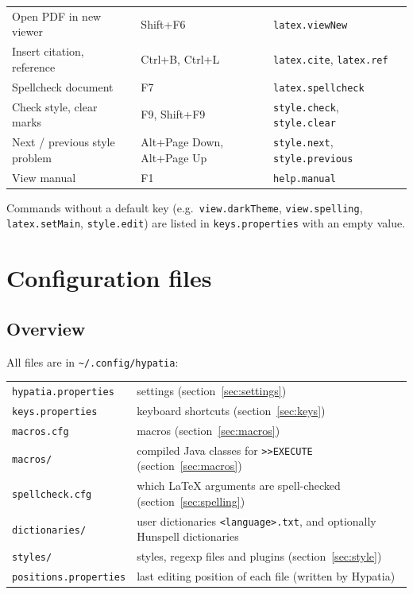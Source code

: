 \documentclass[11pt]{article}
\newcommand{\key}[1]{\textsf{#1}}
\newcommand{\file}[1]{\texttt{#1}}
\newcommand{\cfgdir}{\texttt{\textasciitilde/.config/hypatia}}
\begin{document}
\begin{center}
\begin{tabular}{lll}
        Open PDF in new viewer & \key{Shift+F6} & \verb+latex.viewNew+\\
        Insert citation, reference & \key{Ctrl+B}, \key{Ctrl+L} & \verb+latex.cite+, \verb+latex.ref+\\
        Spellcheck document & \key{F7} & \verb+latex.spellcheck+\\
        Check style, clear marks & \key{F9}, \key{Shift+F9} & \verb+style.check+, \verb+style.clear+\\
        Next / previous style problem & \key{Alt+Page Down}, \key{Alt+Page Up} & \verb+style.next+, \verb+style.previous+\\
        View manual & \key{F1} & \verb+help.manual+
    \end{tabular}
    \end{center}
    Commands without a default key (e.g.\ \verb+view.darkTheme+, \verb+view.spelling+, \verb+latex.setMain+, \verb+style.edit+) are listed in \file{keys.properties} with an empty value.


    \section{Configuration files}\label{sec:files}

    \subsection{Overview}

    All files are in \cfgdir:\\[2mm]
    \hspace*{1cm}\begin{tabular}{ll}
        \file{hypatia.properties} & settings (section~\ref{sec:settings})\\
        \file{keys.properties} & keyboard shortcuts (section~\ref{sec:keys})\\
        \file{macros.cfg} & macros (section~\ref{sec:macros})\\
        \file{macros/} & compiled Java classes for \verb+>>EXECUTE+ (section~\ref{sec:macros})\\
        \file{spellcheck.cfg} & which LaTeX arguments are spell-checked (section~\ref{sec:spelling})\\
        \file{dictionaries/} & user dictionaries \verb+<language>.txt+, and optionally Hunspell dictionaries\\
        \file{styles/} & styles, regexp files and plugins (section~\ref{sec:style})\\
        \file{positions.properties} & last editing position of each file (written by Hypatia)
    \end{tabular}
\end{document}
